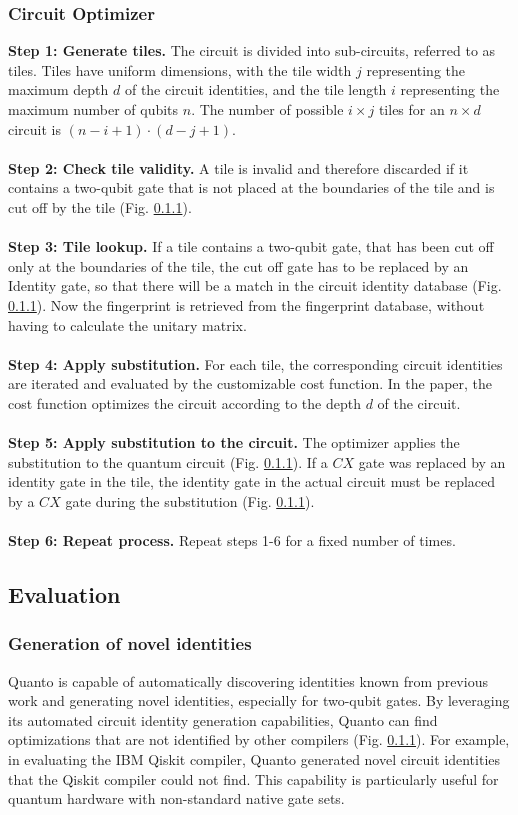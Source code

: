 \subsubsection{Circuit Optimizer}
\textbf{Step 1: Generate tiles.}
The circuit is divided into sub-circuits, referred to as tiles. Tiles have uniform dimensions, with the tile width $j$ representing the maximum depth $d$ of the circuit identities, and the tile length $i$ representing the maximum number of qubits $n$. The number of possible $i \times j$ tiles for an $n \times d$ circuit is $(n-i+1) \cdot (d-j+1)$.
\\\\
\textbf{Step 2: Check tile validity.}
A tile is invalid and therefore discarded if it contains a two-qubit gate that is not placed at the boundaries of the tile and is cut off by the tile (Fig. \ref{}).
\\\\
\textbf{Step 3: Tile lookup.}
If a tile contains a two-qubit gate, that has been cut off only at the boundaries of the tile, the cut off gate has to be replaced by an Identity gate, so that there will be a match in the circuit identity database (Fig. \ref{}). Now the fingerprint is retrieved from the fingerprint database, without having to calculate the unitary matrix. 
\\\\
\textbf{Step 4: Apply substitution.}
For each tile, the corresponding circuit identities are iterated and evaluated by the customizable cost function. In the paper, the cost function optimizes the circuit according to the depth $d$ of the circuit. 
\\\\
\textbf{Step 5: Apply substitution to the circuit.}
The optimizer applies the substitution to the quantum circuit (Fig. \ref{}). If a $CX$ gate was replaced by an identity gate in the tile, the identity gate in the actual circuit must be replaced by a $CX$ gate during the substitution (Fig. \ref{}). 
\\\\
\textbf{Step 6: Repeat process.}
Repeat steps 1-6 for a fixed number of times.

\subsection{Evaluation}
\subsubsection{Generation of novel identities}
Quanto is capable of automatically discovering identities known from previous work and generating novel identities, especially for two-qubit gates. By leveraging its automated circuit identity generation capabilities, Quanto can find optimizations that are not identified by other compilers (Fig. \ref{}). For example, in evaluating the IBM Qiskit compiler, Quanto generated novel circuit identities that the Qiskit compiler could not find. This capability is particularly useful for quantum hardware with non-standard native gate sets.

